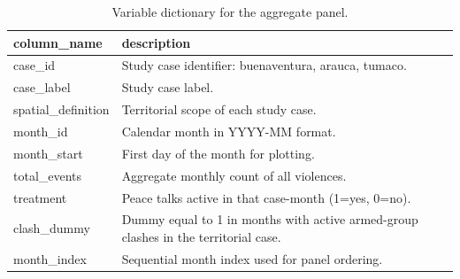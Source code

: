 \begin{table}

\caption{\label{tab:variable_dictionary}Variable dictionary for the aggregate panel.}
\centering
\begin{tabular}[t]{ll}
\toprule
column\_name & description\\
\midrule
case\_id & Study case identifier: buenaventura, arauca, tumaco.\\
case\_label & Study case label.\\
spatial\_definition & Territorial scope of each study case.\\
month\_id & Calendar month in YYYY-MM format.\\
month\_start & First day of the month for plotting.\\
\addlinespace
total\_events & Aggregate monthly count of all violences.\\
treatment & Peace talks active in that case-month (1=yes, 0=no).\\
clash\_dummy & Dummy equal to 1 in months with active armed-group clashes in the territorial case.\\
month\_index & Sequential month index used for panel ordering.\\
\bottomrule
\end{tabular}
\end{table}

